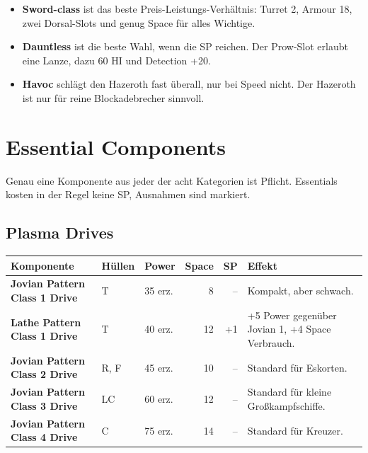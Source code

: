 \documentclass[9pt,a4paper]{extarticle}
\newcommand{\plus}[1]{\textcolor{good}{#1}}
\newcommand{\minus}[1]{\textcolor{bad}{#1}}
\newcommand{\nm}[1]{\textbf{#1}}
\newcommand{\src}[1]{\hfill\raisebox{3pt}{\monofont\footnotesize\color{ink3}#1}}
\newenvironment{urteil}{\begin{tcolorbox}[colback=brasssoft,colframe=brass,boxrule=0pt,leftrule=2pt,arc=0pt,left=6pt,right=6pt,top=4pt,bottom=4pt,before skip=6pt,after skip=10pt,title={\monofont\scriptsize\bfseries\color{brass}URTEIL},coltitle=brass,colbacktitle=brasssoft,toptitle=2pt,bottomtitle=0pt,attach title to upper=\par]\begin{itemize}[leftmargin=10pt,itemsep=1pt,parsep=0pt,topsep=2pt]}{\end{itemize}\end{tcolorbox}}
\begin{document}
\begin{urteil}
\item \nm{Sword-class} ist das beste Preis-Leistungs-Verhältnis: Turret 2, Armour 18, zwei Dorsal-Slots und genug Space für alles Wichtige.
\item \nm{Dauntless} ist die beste Wahl, wenn die SP reichen. Der Prow-Slot erlaubt eine Lanze, dazu 60 HI und Detection +20.
\item \nm{Havoc} schlägt den Hazeroth fast überall, nur bei Speed nicht. Der Hazeroth ist nur für reine Blockadebrecher sinnvoll.
\end{urteil}

\section{Essential Components \src{S. 199--202, Tabelle 8-3}}
Genau eine Komponente aus jeder der acht Kategorien ist Pflicht. Essentials kosten in der Regel keine SP, Ausnahmen sind markiert.

\subsection{Plasma Drives}
\begin{xltabular}{\linewidth}{l H P N N Y}
\toprule
{}\textbf{Komponente} & \textbf{Hüllen} & \textbf{Power} & \textbf{Space} & \textbf{SP} & \textbf{Effekt}\\
\midrule
\endhead
\nm{Jovian Pattern Class 1 Drive} & T & 35 erz. & 8 & – & Kompakt, aber schwach.\\
\nm{Lathe Pattern Class 1 Drive} & T & 40 erz. & 12 & +1 & \plus{+5 Power} gegenüber Jovian 1, \minus{+4 Space} Verbrauch.\\
\nm{Jovian Pattern Class 2 Drive} & R, F & 45 erz. & 10 & – & Standard für Eskorten.\\
\nm{Jovian Pattern Class 3 Drive} & LC & 60 erz. & 12 & – & Standard für kleine Großkampfschiffe.\\
\nm{Jovian Pattern Class 4 Drive} & C & 75 erz. & 14 & – & Standard für Kreuzer.\\
\bottomrule
\end{xltabular}
\end{document}
